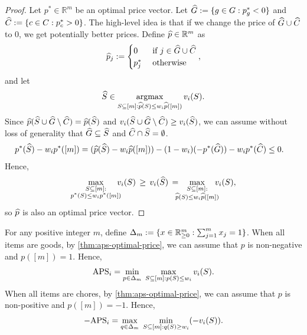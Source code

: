 \begin{proof}
Let $p^* \in \mathbb{R}^m$ be an optimal price vector.
Let $\widehat{G} := \{g \in G: p^*_g < 0\}$ and $\widehat{C} := \{c \in C: p^*_c > 0\}$.
%
The high-level idea is that if we change the price of $\widehat{G} \cup \widehat{C}$ to 0,
we get potentially better prices.
%
Define $\widehat{p} \in \mathbb{R}^m$ as
\[ \widehat{p}_j := \begin{cases}
    0 & \textrm{ if } j \in \widehat{G} \cup \widehat{C}
    \\ p^*_j & \textrm{ otherwise}
    \end{cases}, \]
and let
\[ \widehat{S} \in \operatorname*{argmax}_{S \subseteq [m]: \widehat{p}(S) \le w_i\widehat{p}([m])} v_i(S) .\]
Since $\widehat{p}(\widehat{S} \cup \widehat{G} \setminus \widehat{C}) = \widehat{p}(\widehat{S})$
and $v_i(\widehat{S} \cup \widehat{G} \setminus \widehat{C}) \ge v_i(\widehat{S})$,
we can assume without loss of generality that
$\widehat{G} \subseteq \widehat{S}$ and $\widehat{C} \cap \widehat{S} = \emptyset$.
\begin{align*}
& p^*(\widehat{S}) - w_ip^*([m])
\relax= (\widehat{p}(\widehat{S}) - w_i\widehat{p}([m])) - (1-w_i)(-p^*(\widehat{G})) - w_ip^*(\widehat{C})
\relax\le 0.
\end{align*}
Hence,
\[ \max_{\substack{S \subseteq [m]:\\p^*(S) \le w_ip^*([m])}} \!\!\!\!v_i(S)
    \,\ge\, v_i(\Shat)
    \,= \!\!\!\!\max_{\substack{S \subseteq [m]:\\\phat(S) \le w_i\phat([m])}} \!\!\!\!v_i(S), \]
so $\widehat{p}$ is also an optimal price vector.
\end{proof}

For any positive integer $m$, define
$\Delta_m := \{x \in \mathbb{R}^m_{\ge 0}: \sum_{j=1}^m x_j = 1\}$.
When all items are goods, by \cref{thm:aps-optimal-price}, we can assume \wLoG{} that
$p$ is non-negative and $p([m]) = 1$. Hence,
\[ \mathrm{APS}_i = \min_{p \in \Delta_m}\;\max_{S \subseteq [m]: p(S) \le w_i} v_i(S). \]
%
When all items are chores, by \cref{thm:aps-optimal-price}, we can assume \wLoG{} that
$p$ is non-positive and $p([m]) = -1$. Hence,
\[ -\mathrm{APS}_i = \max_{q \in \Delta_m}\;\min_{S \subseteq [m]: q(S) \ge w_i} (-v_i(S)). \]

